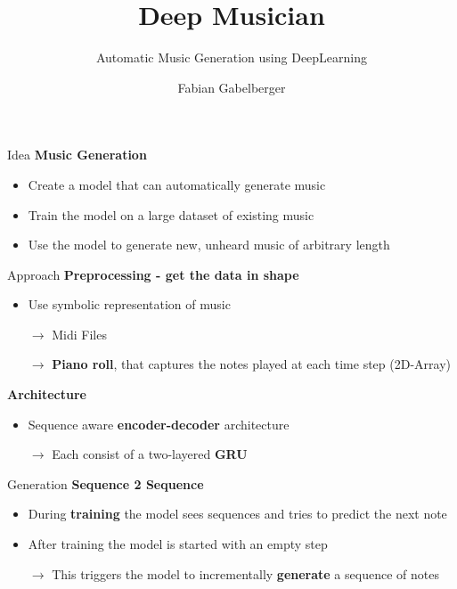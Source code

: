 \documentclass[xcolor={dvipsnames},12pt]{beamer}
\title{Deep Musician}
\subtitle{Automatic Music Generation using DeepLearning}
\author{Fabian Gabelberger}
\begin{document}
\maketitle

\begin{frame}{Idea}
    \textbf{Music Generation}
    \begin{itemize}
        \setlength\itemsep{1em}
        \item Create a model that can automatically generate music
        \item Train the model on a large dataset of existing music
        \item Use the model to generate new, unheard music of arbitrary length
    \end{itemize}
\end{frame}

\begin{frame}{Approach}
    \textbf{Preprocessing - get the data in shape}
    \begin{itemize}
        \item Use symbolic representation of music
        \item[$\rightarrow$] Midi Files
        \item[$\rightarrow$] \textbf{Piano roll}, that captures the
            notes played at each time step (2D-Array)
    \end{itemize}

    \textbf{Architecture}
    \begin{itemize}
        \item Sequence aware \textbf{encoder-decoder} architecture
        \item[$\rightarrow$] Each consist of a two-layered \textbf{GRU}
    \end{itemize}
\end{frame}

\begin{frame}{Generation}
    \textbf{Sequence 2 Sequence}
    \begin{itemize}
        \item During \textbf{training} the model sees sequences and tries
              to predict the next note
        \item After training the model is started with an empty step
        \item[$\rightarrow$] This triggers the model to incrementally
            \textbf{generate}
            a sequence of notes
    \end{itemize}
\end{frame}
\end{document}
